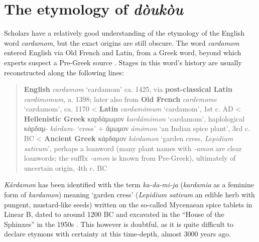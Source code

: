 \documentclass[12pt]{article}
\newcommand{\lb}[1]{\linearbfont{#1}\rmfamily}
\begin{document}




\section{The etymology of \textit{dòukòu}}\label{sec:etymology}

Scholars have a relatively good understanding of the etymology of the English word \textit{cardamom}, but the exact origins are still obscure. The word \textit{cardamom} entered English via Old French and Latin, from a Greek word, beyond which experts suspect a Pre-Greek source \parencite{beekes_2010_etymological}. Stages in this word's history are usually reconstructed along the following lines:

\begin{quote}
    \textbf{English} \textit{cardamom} `cardamom' ca. 1425, via \textbf{post-classical Latin} \textit{cardimomum}, a. 1398; 
    later also from \textbf{Old French} \textit{cardemome} `cardamom', ca. 1170
    < \textbf{Latin} \textit{cardamōmum} `cardamom', 1st c. AD
    < \textbf{Hellenistic Greek} {καρδάμωμον} \textit{kardámōmon} `cardamom', haplological κάρδαμ- \textit{kárdam-} `cress' + ἄμωμον \textit{ámōmon} `an Indian spice plant', 3rd c. BC
    < \textbf{Ancient Greek} {κάρδαμον} \textit{kárdamon} `garden cress, \textit{Lepidium sativum}', perhaps a loanword (many plant names with \textit{-amon} are clear loanwords; the suffIx \textit{-amon} is known from Pre-Greek), ultimately of uncertain origin, 4th c. BC 
    \parencites[s.v. cardamom]{oed}[s.v. cardamome]{tlfi}[s.v. cardamomum]{lewis_1879_latin}[s.v. καρδάμωμον]{liddell_1940_greekenglish}[s.v. κάρδαμον]{liddell_1940_greekenglish}[644]{beekes_2010_etymological}
\end{quote}

\textit{Kárdamon} has been identified with the term \lb{𐀏𐀅𐀖𐀊} \textit{ka-da-mi-ja} (\textit{kardamia} as a feminine form of \textit{kardamon}) meaning `garden cress' (\textit{Lepidium sativum} an edible herb with pungent, mustard-like seeds) written on the so-called Mycenaean spice tablets in Linear B, dated to around 1200 BC and excavated in the ``House of the Sphinxes'' in the 1950s \parencite[107]{bennett_1958_mycenae}. This however is doubtful, as it is quite difficult to declare etymons with certainty at this time-depth, almost 3000 years ago.
\end{document}
